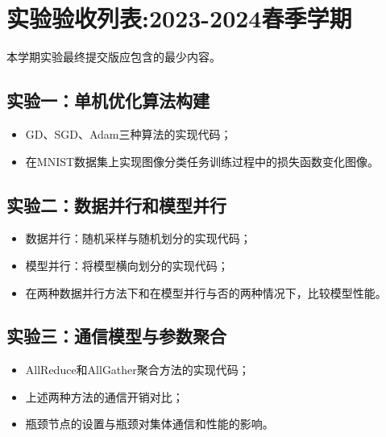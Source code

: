 \chapter{实验验收列表:2023-2024春季学期}

本学期实验最终提交版应包含的最少内容。

\section{实验一：单机优化算法构建}
\begin{itemize}
    \item GD、SGD、Adam三种算法的实现代码；
    \item 在MNIST数据集上实现图像分类任务训练过程中的损失函数变化图像。
\end{itemize}

\section{实验二：数据并行和模型并行}
\begin{itemize}
    \item 数据并行：随机采样与随机划分的实现代码；
    \item 模型并行：将模型横向划分的实现代码；
    \item 在两种数据并行方法下和在模型并行与否的两种情况下，比较模型性能。
\end{itemize}

\section{实验三：通信模型与参数聚合}
\begin{itemize}
    \item AllReduce和AllGather聚合方法的实现代码；
    \item 上述两种方法的通信开销对比；
    \item 瓶颈节点的设置与瓶颈对集体通信和性能的影响。
\end{itemize}